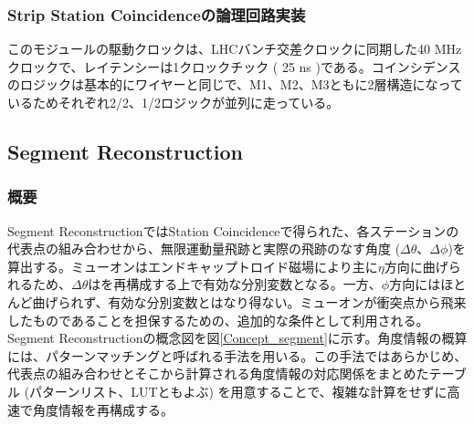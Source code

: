 \subsubsection*{Strip Station Coincidenceの論理回路実装}
このモジュールの駆動クロックは、LHCバンチ交差クロックに同期した40 MHzクロックで、レイテンシーは1クロックチック ( 25 ns )である。コインシデンスのロジックは基本的にワイヤーと同じで、M1、M2、M3ともに2層構造になっているためそれぞれ2/2、1/2ロジックが並列に走っている。


\subsection{Segment Reconstruction}
\label{subsec:segment_reco}
\subsubsection*{概要}
Segment ReconstructionではStation Coincidenceで得られた、各ステーションの代表点の組み合わせから、無限運動量飛跡と実際の飛跡のなす角度 ($\Delta\theta$、$\Delta\phi$)を算出する。ミューオンはエンドキャップトロイド磁場により主に$\eta$方向に曲げられるため、$\Delta\theta$は\pt を再構成する上で有効な分別変数となる。一方、$\phi$方向にはほとんど曲げられず、有効な分別変数とはなり得ない。ミューオンが衝突点から飛来したものであることを担保するための、追加的な条件として利用される。Segment Reconstructionの概念図を図\ref{Concept_segment}に示す。角度情報の概算には、パターンマッチングと呼ばれる手法を用いる。この手法ではあらかじめ、代表点の組み合わせとそこから計算される角度情報の対応関係をまとめたテーブル (パターンリスト、LUTともよぶ) を用意することで、複雑な計算をせずに高速で角度情報を再構成する。

